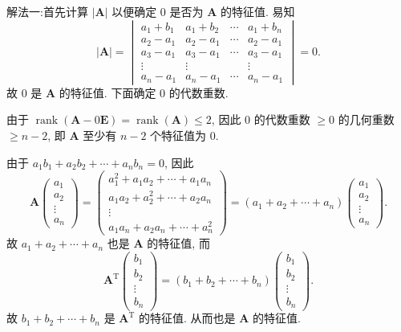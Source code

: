 \documentclass[../../main.tex]{subfiles}%
\begin{document}
\begin{solution}

{\color{blue}解法一:}首先计算 $|\boldsymbol{A}|$ 以便确定 $0$ 是否为 $\boldsymbol{A}$ 的特征值. 易知
$$
|\boldsymbol{A}| = \begin{vmatrix} a_1 + b_1 & a_1 + b_2 & \cdots & a_1 + b_n \\ a_2 - a_1 & a_2 - a_1 & \cdots & a_2 - a_1 \\ a_3 - a_1 & a_3 - a_1 & \cdots & a_3 - a_1 \\ \vdots & \vdots & & \vdots \\ a_n - a_1 & a_n - a_1 & \cdots & a_n - a_1 \end{vmatrix} = 0.
$$
故 $0$ 是 $\boldsymbol{A}$ 的特征值. 下面确定 $0$ 的代数重数.

由于 $\operatorname{rank}(\boldsymbol{A} - 0\boldsymbol{E}) = \operatorname{rank}(\boldsymbol{A}) \leqslant 2$, 因此 $0$ 的代数重数 $\geqslant 0$ 的几何重数 $\geqslant n - 2$, 即 $\boldsymbol{A}$ 至少有 $n - 2$ 个特征值为 $0$.

由于 $a_1b_1 + a_2b_2 + \cdots + a_nb_n = 0$, 因此
$$
\boldsymbol{A} \begin{pmatrix} a_1 \\ a_2 \\ \vdots \\ a_n \end{pmatrix} = \begin{pmatrix} a_1^2 + a_1a_2 + \cdots + a_1a_n \\ a_1a_2 + a_2^2 + \cdots + a_2a_n \\ \vdots \\ a_1a_n + a_2a_n + \cdots + a_n^2 \end{pmatrix} = (a_1 + a_2 + \cdots + a_n) \begin{pmatrix} a_1 \\ a_2 \\ \vdots \\ a_n \end{pmatrix}.
$$
故 $a_1 + a_2 + \cdots + a_n$ 也是 $\boldsymbol{A}$ 的特征值, 而
$$
\boldsymbol{A}^{\mathrm{T}} \begin{pmatrix} b_1 \\ b_2 \\ \vdots \\ b_n \end{pmatrix} = (b_1 + b_2 + \cdots + b_n) \begin{pmatrix} b_1 \\ b_2 \\ \vdots \\ b_n \end{pmatrix}.
$$
故 $b_1 + b_2 + \cdots + b_n$ 是 $\boldsymbol{A}^{\mathrm{T}}$ 的特征值. 从而也是 $\boldsymbol{A}$ 的特征值.


\end{solution}
\end{document}
